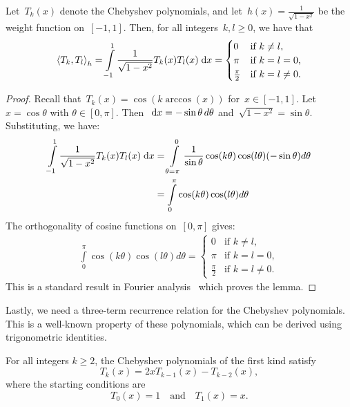\begin{lemma}
Let~$T_k(x)$ denote the Chebyshev polynomials, and let~$h(x) = \frac{1}{\sqrt{1 - x^2}}$ be the weight function on~$[-1, 1]$. Then, for all integers~$k, l \geq 0$, we have that
\begin{equation} \label{eq:orthogonality}
    \left \langle T_k, T_l \right \rangle_h = \int\limits_{-1}^1 \frac{1}{\sqrt{1 - x^2}} T_k(x) T_l(x) \;\mathrm{d}x =
    \begin{cases}
        0               & \text{if } k \neq l,\\
        \pi             & \text{if } k = l = 0,\\
        \frac{\pi}{2}   & \text{if } k = l \neq 0.
    \end{cases}
\end{equation}
\end{lemma}

\begin{proof}
Recall that~$T_k(x) = \cos(k \arccos(x))$ for~$x \in [-1, 1]$. Let~$x = \cos \theta$ with $\theta \in [0, \pi]$. Then~$\;\mathrm{d}x = -\sin \theta \, d\theta$ and~$\sqrt{1 - x^2} = \sin \theta$.
Substituting, we have:
\begin{align*}
    \int\limits_{-1}^1 \frac{1}{\sqrt{1 - x^2}} T_k(x) T_l(x) \;\mathrm{d}x
    &= \int\limits_{\theta=\pi}^{0} \frac{1}{\sin \theta} \cos(k \theta) \cos(l \theta) (-\sin \theta) d\theta \\
    &= \int\limits_{0}^{\pi} \cos(k \theta) \cos(l \theta) d\theta
\end{align*}
The orthogonality of cosine functions on~$[0, \pi]$ gives:
\begin{align*}
    \int\limits_{0}^{\pi} \cos(k \theta) \cos(l \theta) d\theta =
    \begin{cases}
        0               & \text{if } k \neq l,\\
        \pi             & \text{if } k = l = 0,\\
        \frac{\pi}{2}   & \text{if } k = l \neq 0.
    \end{cases}
\end{align*}
This is a standard result in Fourier analysis~\cite{kreyszig} which proves the lemma.
\end{proof}

Lastly, we need a three-term recurrence relation for the Chebyshev polynomials. This is a well-known property of these polynomials, which can be derived using trigonometric identities.

\begin{lemma}
For all integers $\mbox{$k \geq 2$}$, the Chebyshev polynomials of the first kind satisfy
\[
T_{k}(x) = 2xT_{k - 1}(x) - T_{k - 2}(x),
\]
where the starting conditions are
\[
T_0(x) = 1 \quad \text{and} \quad T_1(x) = x.
\]
\end{lemma}

